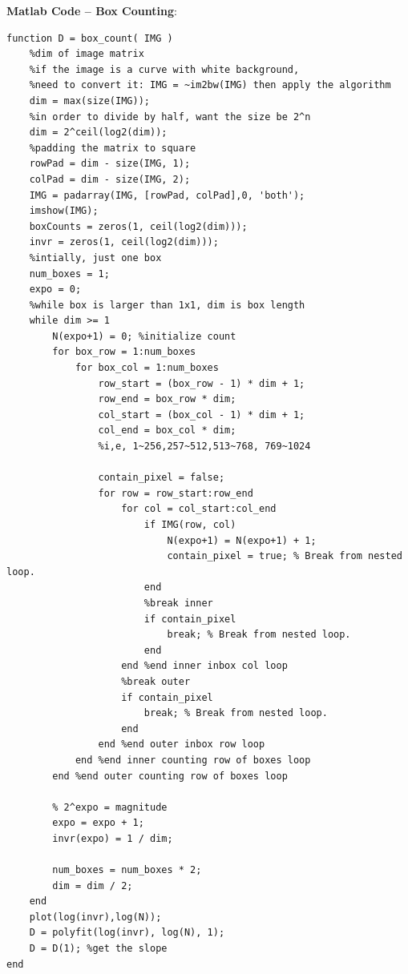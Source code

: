 \documentclass{article}
\begin{document}
\textbf{Matlab Code -- Box Counting}:
\begin{lstlisting}
function D = box_count( IMG )
    %dim of image matrix
    %if the image is a curve with white background,
    %need to convert it: IMG = ~im2bw(IMG) then apply the algorithm
    dim = max(size(IMG));
    %in order to divide by half, want the size be 2^n
    dim = 2^ceil(log2(dim));
    %padding the matrix to square
    rowPad = dim - size(IMG, 1);
    colPad = dim - size(IMG, 2);
    IMG = padarray(IMG, [rowPad, colPad],0, 'both');
    imshow(IMG);
    boxCounts = zeros(1, ceil(log2(dim)));
    invr = zeros(1, ceil(log2(dim)));
    %intially, just one box
    num_boxes = 1;
    expo = 0;
    %while box is larger than 1x1, dim is box length
    while dim >= 1
        N(expo+1) = 0; %initialize count
        for box_row = 1:num_boxes
            for box_col = 1:num_boxes
                row_start = (box_row - 1) * dim + 1;
                row_end = box_row * dim;
                col_start = (box_col - 1) * dim + 1;
                col_end = box_col * dim;
                %i,e, 1~256,257~512,513~768, 769~1024
                
                contain_pixel = false;
                for row = row_start:row_end
                    for col = col_start:col_end
                        if IMG(row, col)
                            N(expo+1) = N(expo+1) + 1;
                            contain_pixel = true; % Break from nested loop.
                        end
                        %break inner
                        if contain_pixel
                            break; % Break from nested loop.
                        end
                    end %end inner inbox col loop
                    %break outer
                    if contain_pixel
                        break; % Break from nested loop.
                    end                   
                end %end outer inbox row loop
            end %end inner counting row of boxes loop
        end %end outer counting row of boxes loop
        
        % 2^expo = magnitude
        expo = expo + 1;
        invr(expo) = 1 / dim;
        
        num_boxes = num_boxes * 2;
        dim = dim / 2;
    end
    plot(log(invr),log(N));
    D = polyfit(log(invr), log(N), 1);
    D = D(1); %get the slope
end
\end{lstlisting}
\end{document}
